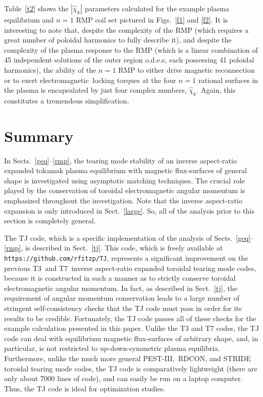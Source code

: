 \documentclass[12pt,prb,aps]{revtex4-1}
\begin{document}
Table~\ref{t2} shows the $|\hat{\chi}_k|$ parameters calculated for the example plasma equilibrium and $n=1$ RMP coil
set pictured in Figs.~\ref{f1} and \ref{f2}. It is interesting to note that, despite the complexity of the RMP (which requires a great number of
poloidal harmonics to fully describe it), and despite the
complexity of the plasma response to the RMP (which is a linear combination of 45 independent solutions of the
outer region o.d.e.s, each possessing 41 poloidal harmonics), the ability of the $n=1$ RMP to either drive magnetic reconnection or to exert electromagnetic\
locking torques at the four $n=1$ rational surfaces in the plasma is encapsulated by just four complex numbers, $\hat{\chi}_k$. 
Again,
this constitutes a tremendous simplification. 
  
\section{Summary}\label{sum}
In Sects.~\ref{geq}--\ref{rmp}, the tearing mode stability of an inverse aspect-ratio expanded tokamak plasma equilibrium  with magnetic flux-surfaces of general 
shape is investigated using asymptotic matching techniques. The crucial role played by the conservation of
toroidal electromagnetic angular momentum is emphasized throughout the investigation. Note that the inverse aspect-ratio
expansion is only introduced in Sect.~\ref{large}. So, all of the analysis prior to this section is completely general. 

The TJ code,
which is a specific implementation of the analysis of Sects.~\ref{geq}--\ref{rmp}, is described in Sect.~\ref{tj}. This code, which is
freely available at {\tt https://github.com/rfitzp/TJ}, represents a significant improvement on the previous T3\,\cite{connor} and T7\,\cite{am1} inverse aspect-ratio expanded toroidal tearing mode
codes, because it is constructed in such a manner as to strictly conserve toroidal electromagnetic
angular momentum. In fact, as described in Sect.~\ref{tj}, the requirement of angular momentum conservation leads to a large number of
stringent self-consistency checks that the TJ code must pass in order for its results to be credible. Fortunately, the TJ code passes all of these
checks for the example calculation presented in this paper. 
Unlike the T3 and T7 codes, the TJ code can deal with equilibrium magnetic flux-surfaces of arbitrary shape, and, in particular, 
is not restricted to up-down-symmetric  plasma equilibria. Furthermore, unlike the much more general  PEST-III,\,\cite{pletz1} RDCON,\cite{aglas2} and STRIDE\,\cite{aglas1} toroidal
tearing mode codes, the TJ code is comparatively lightweight (there are only about 7000 lines of code), and can easily be run on a laptop computer. Thus, the TJ code is ideal for
optimization studies. 
\end{document}
